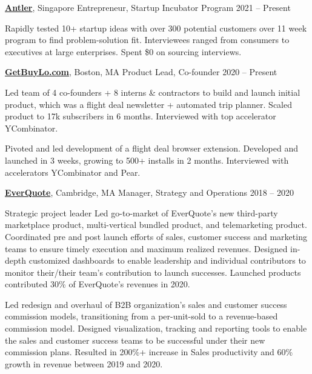 \documentclass[letterpaper,10pt,oneside]{article}
\begin{document}
\begin{body}
\begin{flushleft}
\end{flushleft}

\href{https://antler.co/}
{\textbf{Antler}},
Singapore
\GapNoBreak
Entrepreneur, Startup Incubator Program
\hfill
2021 -- Present
\begin{flushleft}

\BulletItem Rapidly tested 10+ startup ideas with over 300 potential customers over 11 week program to find problem-solution fit. Interviewees ranged from consumers to executives at large enterprises. Spent \$0 on sourcing interviews.

\end{flushleft}

\href{https://getbuylo.com/}
{\textbf{GetBuyLo.com}},
Boston, MA
\GapNoBreak
Product Lead, Co-founder
\hfill
2020 -- Present
\begin{flushleft}

\BulletItem Led team of 4 co-founders + 8 interns \& contractors to build and launch initial product, which was a flight deal newsletter + automated trip planner. Scaled product to 17k subscribers in 6 months. Interviewed with top accelerator YCombinator.

\vspace{0.5em} \BulletItem Pivoted and led development of a flight deal browser extension. Developed and launched in 3 weeks, growing to 500+ installs in 2 months. Interviewed with accelerators YCombinator and Pear.

\end{flushleft}


\href{http://www.everquote.com/}
{\textbf{EverQuote}},
Cambridge, MA
\GapNoBreak
Manager, Strategy and Operations
\hfill
2018 -- 2020
\begin{flushleft}

\BulletItem Strategic project leader
\vspace{0.5em} \SubBulletItem Led go-to-market of EverQuote's new third-party marketplace product, multi-vertical bundled product, and telemarketing product. Coordinated pre and post launch efforts of sales, customer success and marketing teams to ensure timely execution and maximum realized revenues. Designed in-depth customized dashboards to enable leadership and individual contributors to monitor their/their team's contribution to launch successes. Launched products contributed 30\% of EverQuote's revenues in 2020.

\vspace{0.5em} \SubBulletItem Led redesign and overhaul of B2B organization's sales and customer success commission models, transitioning from a per-unit-sold to a revenue-based commission model. Designed visualization, tracking and reporting tools to enable the sales and customer success teams to be successful under their new commission plans. Resulted in 200\%+ increase in Sales productivity and 60\% growth in revenue between 2019 and 2020.


\end{flushleft}
\end{body}
\end{document}

